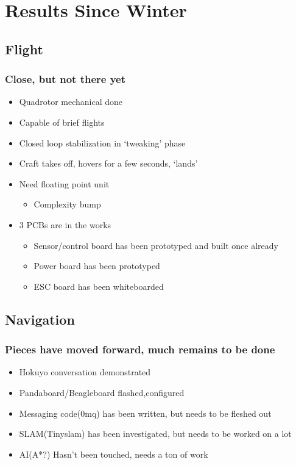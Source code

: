 \documentclass{beamer}
\begin{document}
\section{Results Since Winter}
\subsection{Flight}
\frame
{
    \frametitle{Close, but not there yet}
    \begin{itemize}
        \item Quadrotor mechanical done
        \item Capable of brief flights
        \item Closed loop stabilization in `tweaking' phase
        \item Craft takes off, hovers for a few seconds, `lands'
        \item Need floating point unit
            \begin{itemize}
                \item Complexity bump
            \end{itemize}
        \item 3 PCBs are in the works
            \begin{itemize}
                \item Sensor/control board has been prototyped and built once already
                \item Power board has been prototyped 
                \item ESC board has been whiteboarded
            \end{itemize}
    \end{itemize}
}

\subsection{Navigation}
\frame
{
    \frametitle{Pieces have moved forward, much remains to be done}
    \begin{itemize}
        \item Hokuyo conversation demonstrated
        \item Pandaboard/Beagleboard flashed,configured
        \item Messaging code(0mq) has been written, but needs to be fleshed out
        \item SLAM(Tinyslam) has been investigated, but needs to be worked on a lot
        \item AI(A*?) Hasn't been touched, needs a ton of work
    \end{itemize}
}
\end{document}
